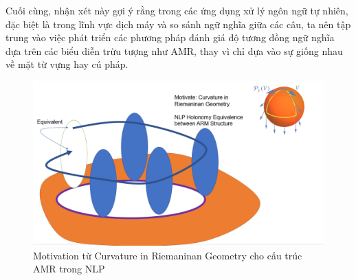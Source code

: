 Cuối cùng, nhận xét này gợi ý rằng trong các ứng dụng xử lý ngôn ngữ tự nhiên, đặc biệt là trong lĩnh vực dịch máy và so sánh ngữ nghĩa giữa các câu, ta nên tập trung vào việc phát triển các phương pháp đánh giá độ tương đồng ngữ nghĩa dựa trên các biểu diễn trừu tượng như AMR, thay vì chỉ dựa vào sự giống nhau về mặt từ vựng hay cú pháp.

\begin{figure}[H]
    \centering
    \includegraphics[width=1\linewidth]{Images/GDL/Riemanian_motivation.png}
    \caption{Motivation từ Curvature in Riemaninan Geometry cho cấu trúc AMR trong NLP}
\end{figure}